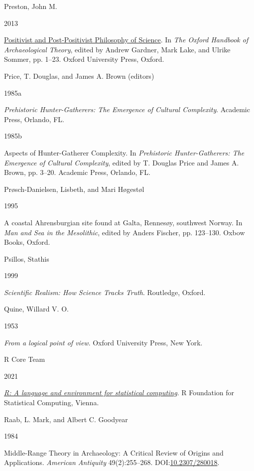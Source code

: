 \documentclass[
  12pt,
  a4paper,
  oneside]{book}
\newlength{\cslhangindent}
\newlength{\csllabelwidth}
\newlength{\cslentryspacingunit} %
\newenvironment{CSLReferences}[2] %
 {%
  \setlength{\parindent}{0pt}
  \ifodd #1
  \let\oldpar\par
  \def\par{\hangindent=\cslhangindent\oldpar}
  \fi
  \setlength{\parskip}{#2\cslentryspacingunit}
 }%
 {}
\newcommand{\CSLBlock}[1]{#1\hfill\break}
\newcommand{\CSLLeftMargin}[1]{\parbox[t]{\csllabelwidth}{#1}}
\newcommand{\CSLRightInline}[1]{\parbox[t]{\linewidth - \csllabelwidth}{#1}\break}
\begin{document}
\begin{CSLReferences}{0}{0}
\leavevmode{}%
\CSLBlock{Preston, John M.}
\CSLLeftMargin{ 2013}
\CSLRightInline{\href{https://doi.org/10.1093/oxfordhb/9780199567942.013.031}{{Positivist and Post-Positivist Philosophy of Science}}. In \emph{{The Oxford Handbook of Archaeological Theory}}, edited by Andrew Gardner, Mark Lake, and Ulrike Sommer, pp. 1--23. Oxford University Press, Oxford.}

\leavevmode{}%
\CSLBlock{Price, T. Douglas, and James A. Brown (editors)}
\CSLLeftMargin{ 1985a}
\CSLRightInline{\emph{{Prehistoric Hunter-Gatherers: The Emergence of Cultural Complexity}}. Academic Press, Orlando, FL.}

\leavevmode{}%
\CSLLeftMargin{ 1985b }
\CSLRightInline{{Aspects of Hunter-Gatherer Complexity}. In \emph{{Prehistoric Hunter-Gatherers: The Emergence of Cultural Complexity}}, edited by T. Douglas Price and James A. Brown, pp. 3--20. Academic Press, Orlando, FL.}

\leavevmode{}%
\CSLBlock{Prøsch-Danielsen, Lisbeth, and Mari Høgestøl}
\CSLLeftMargin{ 1995}
\CSLRightInline{{A coastal Ahrensburgian site found at Galta, Rennesøy, southwest Norway}. In \emph{{Man and Sea in the Mesolithic}}, edited by Anders Fischer, pp. 123--130. Oxbow Books, Oxford.}

\leavevmode{}%
\CSLBlock{Psillos, Stathis}
\CSLLeftMargin{ 1999}
\CSLRightInline{\emph{{Scientific Realism: How Science Tracks Truth}}. Routledge, Oxford.}

\leavevmode{}%
\CSLBlock{Quine, Willard V. O.}
\CSLLeftMargin{ 1953}
\CSLRightInline{\emph{{From a logical point of view}}. Oxford University Press, New York.}

\leavevmode{}%
\CSLBlock{R Core Team}
\CSLLeftMargin{ 2021}
\CSLRightInline{\emph{\href{https://www.R-project.org/}{R: A language and environment for statistical computing}}. R Foundation for Statistical Computing, Vienna.}

\leavevmode{}%
\CSLBlock{Raab, L. Mark, and Albert C. Goodyear}
\CSLLeftMargin{ 1984}
\CSLRightInline{{Middle-Range Theory in Archaeology: A Critical Review of Origins and Applications}. \emph{American Antiquity} 49(2):255--268. DOI:\href{https://doi.org/10.2307/280018}{10.2307/280018}.}


\end{CSLReferences}
\end{document}
